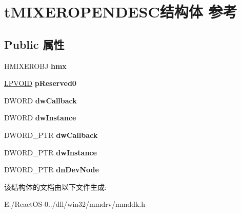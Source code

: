 \hypertarget{structt_m_i_x_e_r_o_p_e_n_d_e_s_c}{}\section{t\+M\+I\+X\+E\+R\+O\+P\+E\+N\+D\+E\+S\+C结构体 参考}
\label{structt_m_i_x_e_r_o_p_e_n_d_e_s_c}
\subsection*{Public 属性}
\begin{DoxyCompactItemize}
\item 
\mbox{\label{structt_m_i_x_e_r_o_p_e_n_d_e_s_c_a27d8f24160f47f4ef494938b1bfd6f7d}} 
H\+M\+I\+X\+E\+R\+O\+BJ {\bfseries hmx}
\item 
\mbox{\label{structt_m_i_x_e_r_o_p_e_n_d_e_s_c_aa100bb6a8eda9c86fa0e3f8b97595bc5}} 
\hyperlink{interfacevoid}{L\+P\+V\+O\+ID} {\bfseries p\+Reserved0}
\item 
\mbox{\label{structt_m_i_x_e_r_o_p_e_n_d_e_s_c_a53c7e1fd0f52768c269cb956b306712f}} 
D\+W\+O\+RD {\bfseries dw\+Callback}
\item 
\mbox{\label{structt_m_i_x_e_r_o_p_e_n_d_e_s_c_ab815572cc7a198813cdd3e926fb53c78}} 
D\+W\+O\+RD {\bfseries dw\+Instance}
\item 
\mbox{\label{structt_m_i_x_e_r_o_p_e_n_d_e_s_c_a0bd1e594e446b7c93019d63cc99194dc}} 
D\+W\+O\+R\+D\+\_\+\+P\+TR {\bfseries dw\+Callback}
\item 
\mbox{\label{structt_m_i_x_e_r_o_p_e_n_d_e_s_c_ab43a25454e7d7da743277f40fbb5dc91}} 
D\+W\+O\+R\+D\+\_\+\+P\+TR {\bfseries dw\+Instance}
\item 
\mbox{\label{structt_m_i_x_e_r_o_p_e_n_d_e_s_c_a4e2a0ea98425a8d79419f2f08d2d05df}} 
D\+W\+O\+R\+D\+\_\+\+P\+TR {\bfseries dn\+Dev\+Node}
\end{DoxyCompactItemize}


该结构体的文档由以下文件生成\+:\begin{DoxyCompactItemize}
\item 
E\+:/\+React\+O\+S-\/0../dll/win32/mmdrv/mmddk.\+h\end{DoxyCompactItemize}
